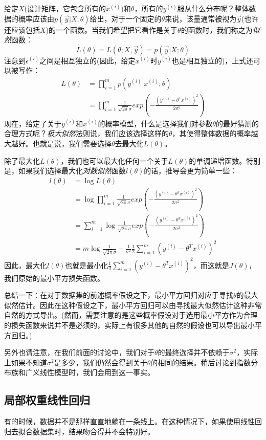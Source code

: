 给定$X$(设计矩阵，它包含所有的$x^{(i)}$)和$\theta$，所有的$y^{(i)}$服从什么分布呢？整体数据的概率应该由$p(\vec{y}|X;\theta)$给出，对于一个固定的$\theta$来说，该量通常被视为$\vec{y}$(也许还应该包括$X$)的一个函数。当我们希望把它看作是关于$\theta$的函数时，我们称之为\emph{似然}函数：
\begin{equation*}
L(\theta) = L(\theta;X,\vec{y}) = p(\vec{y}|X;\theta)
\end{equation*}
注意到$\epsilon^{(i)}$之间是相互独立的(因此，给定$x^{(i)}$时$y^{(i)}$也是相互独立的)，上式还可以被写作：
\begin{equation}
\begin{split}
L(\theta) &= \prod_{i = 1}^mp(y^{(i)}|x^{(i)};\theta) \\
&= \prod_{i = 1}^m\frac{1}{\sqrt{2\pi}\sigma}exp\left(-\frac{(y^{(i)} - \theta^Tx^{(i)})^2}{2\sigma^2}\right)
\end{split}
\end{equation}
现在，给定了关于$y^{(i)}$和$x^{(i)}$的概率模型，什么是选择我们对参数$\theta$的最好猜测的合理方式呢？\emph{极大似然}法则说，我们应该选择这样的$\theta$，其使得整体数据的概率越大越好。也就是说，我们需要选择$\theta$去最大化$L(\theta)$。

除了最大化$L(\theta)$，我们也可以最大化任何一个关于$L(\theta)$的单调递增函数。特别是，如果我们选择最大化\emph{对数似然}函数$l(\theta)$的话，推导会更为简单一些：
\begin{equation}
\begin{split}
l(\theta) &= \log{L(\theta)} \\
&= \log\prod_{i = 1}^m\frac{1}{\sqrt{2\pi}\sigma}exp\left(-\frac{(y^{(i)} - \theta^Tx^{(i)})^2}{2\sigma^2}\right) \\
&= \sum_{i = 1}^m\log\frac{1}{\sqrt{2\pi}\sigma}exp\left(-\frac{(y^{(i)} - \theta^Tx^{(i)})^2}{2\sigma^2}\right) \\
&= m\log\frac{1}{\sqrt{2\pi}\sigma} - \frac{1}{\sigma^2}\frac{1}{2}\sum_{i = 1}^m(y^{(i)} - \theta^Tx^{(i)})^2
\end{split}
\end{equation}
因此，最大化$l(\theta)$也就是最小化$\frac{1}{2}\sum_{i = 1}^m(y^{(i)} - \theta^Tx^{(i)})^2$，而这就是$J(\theta)$，我们原始的最小平方损失函数。

总结一下：在对于数据集的前述概率假设之下，最小平方回归对应于寻找$\theta$的最大似然估计。因此在这种假设之下，最小平方回归可以由寻找最大似然估计这种非常自然的方式导出。(然而，需要注意的是这些概率假设对于选用最小平方作为合理的损失函数来说并不是必须的，实际上有很多其他的自然的假设也可以导出最小平方回归。)

另外也请注意，在我们前面的讨论中，我们对于$\theta$的最终选择并不依赖于$\sigma^2$，实际上如果不知道$\sigma^2$是多少，我们仍然会得到关于$\theta$的相同的结果。稍后讨论到指数分布族和广义线性模型时，我们会用到这一事实。

\subsection{局部权重线性回归}
有的时候，数据并不是那样直直地躺在一条线上。在这种情况下，如果使用线性回归去拟合数据集时，结果吻合得并不会特别好。

